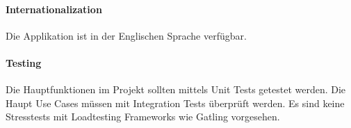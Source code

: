 \paragraph{Internationalization}
Die Applikation ist in der Englischen Sprache verfügbar.

\paragraph{Testing}
Die Hauptfunktionen im Projekt sollten mittels Unit Tests getestet werden. Die Haupt Use Cases müssen mit Integration Tests überprüft werden. Es sind keine Stresstests mit Loadtesting Frameworks wie Gatling vorgesehen.



